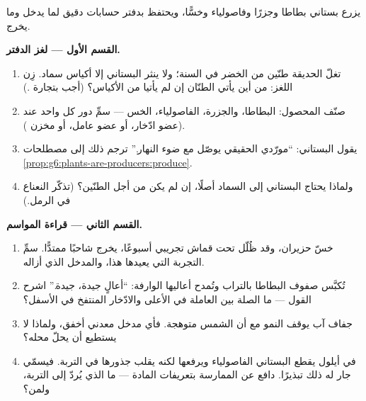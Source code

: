 \begin{problem}\label{pb:g6:plants-are-producers:1}
يزرع بستاني بطاطا وجزرًا وفاصولياء وخسًّا، ويحتفظ بدفتر حسابات دقيق
لما يدخل وما يخرج.

\medskip\noindent\textbf{القسم الأول --- لغز الدفتر.}
\begin{enumerate}
  \item تغلّ الحديقة طنّين من الخضر في السنة؛ ولا ينثر البستاني
        إلا أكياس سماد. زِن اللغز: من أين يأتي الطنّان إن لم
        يأتيا من الأكياس؟ (أجب بتجارة .)
  \item صنّف المحصول: البطاطا، والجزرة،  الفاصولياء، 
        الخس --- سمِّ دور كل واحد عند  (عضو ادّخار، أو عضو
        عامل، أو مخزن ).
  \item يقول البستاني: ``مورّدي الحقيقي يوصّل مع ضوء النهار.''
        ترجم ذلك إلى مصطلحات
        \cref{prop:g6:plants-are-producers:produce}.
  \item ولماذا يحتاج البستاني إلى السماد أصلًا، إن لم يكن من أجل
        الطنّين؟ (تذكّر النعناع في الرمل.)
\end{enumerate}

\medskip\noindent\textbf{القسم الثاني --- قراءة المواسم.}
\begin{enumerate}[resume]
  \item خسّ حزيران، وقد ظُلّل تحت قماش تجريبي أسبوعًا، يخرج شاحبًا
        ممتدًّا. سمِّ التجربة التي يعيدها هذا، والمدخل الذي أزاله.
  \item تُكبَّس صفوف البطاطا بالتراب وتُمدح أعاليها الوارفة:
        ``أعالٍ جيدة،  جيدة.'' اشرح القول --- ما الصلة بين
         العاملة في الأعلى والادّخار المنتفخ في الأسفل؟
  \item جفاف آب يوقف النمو مع أن الشمس متوهجة. فأي مدخل معدني
        أخفق، ولماذا لا يستطيع  أن يحلّ محله؟
  \item في أيلول يقطع البستاني  الفاصولياء ويرفعها لكنه
        يقلب جذورها في التربة. فيسمّي جار له ذلك تبذيرًا. دافع عن
        الممارسة بتعريفات المادة --- ما الذي يُردّ إلى التربة،
        ولمن؟
\end{enumerate}


\end{problem}
